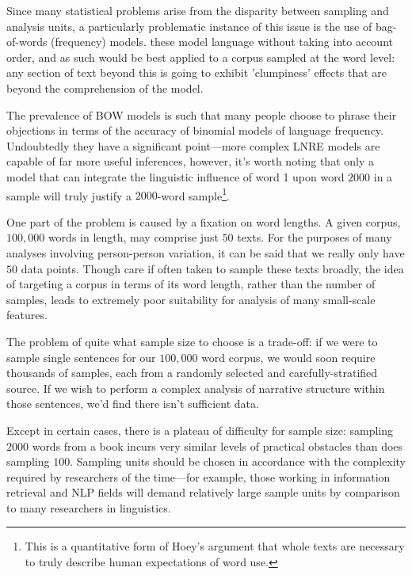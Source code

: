 Since many statistical problems arise from the disparity between sampling and analysis units, a particularly problematic instance of this issue is the use of bag-of-words (frequency) models.  these model language without taking into account order, and as such would be best applied to a corpus sampled at the word level: any section of text beyond this is going to exhibit 'clumpiness' effects that are beyond the comprehension of the model.

The prevalence of BOW models is such that many people choose to phrase their objections in terms of the accuracy of binomial models of language frequency\cite{kilgarriff2005language,evert2004simple,evert2007zipfr}.  Undoubtedly they have a significant point---more complex LNRE models are capable of far more useful inferences, however, it's worth noting that only a model that can integrate the linguistic influence of word 1 upon word $2000$ in a sample will truly justify a $2000$-word sample\footnote{This is a quantitative form of Hoey's argument that whole texts are necessary to truly describe human expectations of word use.}.


One part of the problem is caused by a fixation on word lengths. A given corpus, $100,000$ words in length, may comprise just $50$ texts. For the purposes of many analyses involving person-person variation, it can be said that we really only have $50$ data points. Though care if often taken to sample these texts broadly, the idea of targeting a corpus in terms of its word length, rather than the number of samples, leads to extremely poor suitability for analysis of many small-scale features.

The problem of quite what sample size to choose is a trade-off: if we were to sample single sentences for our $100,000$ word corpus, we would soon require thousands of samples, each from a randomly selected and carefully-stratified source. If we wish to perform a complex analysis of narrative structure within those sentences, we'd find there isn't sufficient data.

Except in certain cases, there is a plateau of difficulty for sample size: sampling $2000$ words from a book incurs very similar levels of practical obstacles than does sampling $100$. Sampling units should be chosen in accordance with the complexity required by researchers of the time---for example, those working in information retrieval and NLP fields will demand relatively large sample units by comparison to many researchers in linguistics.

